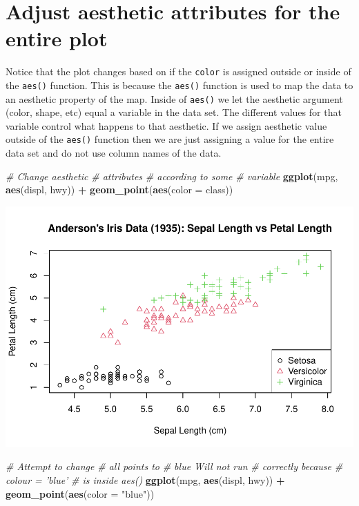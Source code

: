 \documentclass[
]{book}
\newenvironment{Shaded}{\begin{snugshade}}{\end{snugshade}}
\newcommand{\CommentTok}[1]{\textcolor[rgb]{0.56,0.35,0.01}{\textit{#1}}}
\newcommand{\DataTypeTok}[1]{\textcolor[rgb]{0.13,0.29,0.53}{#1}}
\newcommand{\KeywordTok}[1]{\textcolor[rgb]{0.13,0.29,0.53}{\textbf{#1}}}
\newcommand{\NormalTok}[1]{#1}
\newcommand{\OperatorTok}[1]{\textcolor[rgb]{0.81,0.36,0.00}{\textbf{#1}}}
\newcommand{\StringTok}[1]{\textcolor[rgb]{0.31,0.60,0.02}{#1}}
\begin{document}
\hypertarget{adjust-aesthetic-attributes-for-the-entire-plot}{%
\section{Adjust aesthetic attributes for the entire plot}\label{adjust-aesthetic-attributes-for-the-entire-plot}}

Notice that the plot changes based on if the \texttt{color} is assigned outside or inside of the \texttt{aes()} function. This is because the \texttt{aes()} function is used to map the data to an aesthetic property of the map. Inside of \texttt{aes()} we let the aesthetic argument (color, shape, etc) equal a variable in the data set. The different values for that variable control what happens to that aesthetic. If we assign aesthetic value outside of the \texttt{aes()} function then we are just assigning a value for the entire data set and do not use column names of the data.

\begin{Shaded}
\begin{Highlighting}[]
\CommentTok{# Change aesthetic}
\CommentTok{# attributes}
\CommentTok{# according to some}
\CommentTok{# variable}
\KeywordTok{ggplot}\NormalTok{(mpg, }\KeywordTok{aes}\NormalTok{(displ,}
\NormalTok{    hwy)) }\OperatorTok{+}\StringTok{ }\KeywordTok{geom_point}\NormalTok{(}\KeywordTok{aes}\NormalTok{(}\DataTypeTok{color =}\NormalTok{ class))}
\end{Highlighting}
\end{Shaded}

\includegraphics{_main_files/figure-latex/unnamed-chunk-254-1.pdf}

\begin{Shaded}
\begin{Highlighting}[]
\CommentTok{# Attempt to change}
\CommentTok{# all points to}
\CommentTok{# blue Will not run}
\CommentTok{# correctly because}
\CommentTok{# colour = 'blue'}
\CommentTok{# is inside aes()}
\KeywordTok{ggplot}\NormalTok{(mpg, }\KeywordTok{aes}\NormalTok{(displ,}
\NormalTok{    hwy)) }\OperatorTok{+}\StringTok{ }\KeywordTok{geom_point}\NormalTok{(}\KeywordTok{aes}\NormalTok{(}\DataTypeTok{color =} \StringTok{"blue"}\NormalTok{))}
\end{Highlighting}
\end{Shaded}
\end{document}

